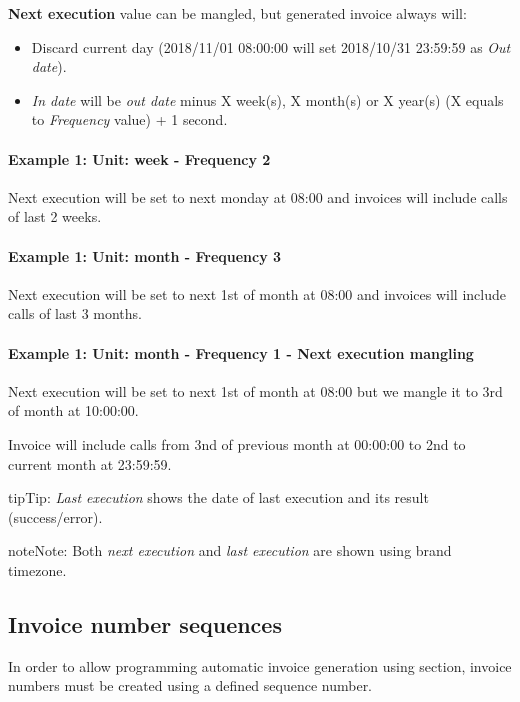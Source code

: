 \documentclass[letterpaper,10pt,english]{sphinxmanual}
\begin{document}
\textbf{Next execution} value can be mangled, but generated invoice always will:
\begin{itemize}
\item {} 
Discard current day (2018/11/01 08:00:00 will set 2018/10/31 23:59:59 as \emph{Out date}).

\item {} 
\emph{In date} will be \emph{out date} minus X week(s), X month(s) or X year(s) (X equals to \emph{Frequency} value) + 1 second.

\end{itemize}
\paragraph{Example 1: Unit: week - Frequency 2}

Next execution will be set to next monday at 08:00 and invoices will include calls of last 2 weeks.
\paragraph{Example 1: Unit: month - Frequency 3}

Next execution will be set to next 1st of month at 08:00 and invoices will include calls of last 3 months.
\paragraph{Example 1: Unit: month - Frequency 1 - Next execution mangling}

Next execution will be set to next 1st of month at 08:00 but we mangle it to 3rd of month at 10:00:00.

Invoice will include calls from 3nd of previous month at 00:00:00 to 2nd to current month at 23:59:59.

\begin{notice}{tip}{Tip:}
\emph{Last execution} shows the date of last execution and its result (success/error).
\end{notice}

\begin{notice}{note}{Note:}
Both \emph{next execution} and \emph{last execution} are shown using brand timezone.
\end{notice}


\subsection{Invoice number sequences}
\label{administration_portal/brand/invoicing/invoice_number_sequences:invoice-number-sequences}\label{administration_portal/brand/invoicing/invoice_number_sequences::doc}
In order to allow programming automatic invoice generation using {\hyperref[administration_portal/brand/invoicing/invoice_schedulers:invoice\string-schedulers]{}} section, invoice
numbers must be created using a defined sequence number.
\end{document}
